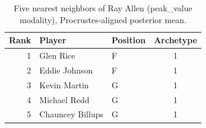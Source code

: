 \begin{table}[htbp]
  \centering\small
  \begin{tabular}{rllc}
    \toprule
    Rank & Player & Position & Archetype \\
    \midrule
    1 & Glen Rice & F & 1 \\
    2 & Eddie Johnson & F & 1 \\
    3 & Kevin Martin & G & 1 \\
    4 & Michael Redd & G & 1 \\
    5 & Chauncey Billups & G & 1 \\
    \bottomrule
  \end{tabular}
  \caption{Five nearest neighbors of Ray Allen (peak_value modality), Procrustes-aligned posterior mean.}
  \label{tab:Ray_Allen_neighbors_peak_value}
\end{table}


